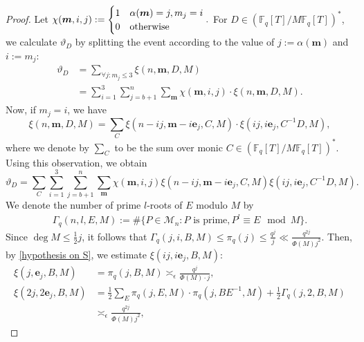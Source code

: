 \documentclass[12pt]{amsart}
\numberwithin{equation}{section}
\theoremstyle{definition}
\theoremstyle{remark}
\newcommand{\FF}{\mathbb{F}}
\begin{document}
\begin{proof}
    Let 
    $        \chi(\boldsymbol{m},i,j) := \begin{cases}
        1 & \alpha(\boldsymbol{m})=j, m_j=i \\
        0 & \textnormal{otherwise}
    \end{cases}.$
    For $D \in (\FF_q[T]/M\FF_q[T])^*$, we calculate $\vartheta_D$ by splitting the event according to the value of $j:= \alpha(\boldsymbol{m})$ and $i:=m_j$:
    \begin{equation}
    \begin{split}
        \vartheta_D &=\sum_{\forall j: m_j \leq 3} \xi(n,\boldsymbol{m},D,M)\\
        &= \sum_{i=1}^3 \sum_{j=b+1}^n \sum_{\boldsymbol{m}} \chi(\boldsymbol{m},i,j) \cdot \xi(n,\boldsymbol{m},D,M).
     \end{split}
    \end{equation}
    Now,  if $m_j=i$, we have
    \[
        \xi(n,\boldsymbol{m},D,M) = \sum_C \xi(n-ij, \boldsymbol{m}-i\boldsymbol{e}_j, C,M) \cdot \xi(ij,i\boldsymbol{e}_j,C^{-1}D,M),
    \]
    where we denote by $\sum_C$ to be the sum over monic $C \in (\FF_q[T]/M\FF_q[T])^*$.
    Using this observation, we obtain
    \begin{equation}\label{eq:theta_calc}
        \vartheta_D = \sum_C \sum_{i=1}^3 \sum_{j=b+1}^n \mathop{\sum}_{\boldsymbol{m}} \chi(\boldsymbol{m},i,j) \xi(n-ij ,\boldsymbol{m} -i \boldsymbol{e}_j,C,M)  \xi(ij,i \boldsymbol{e}_j, C^{-1}D,M).
    \end{equation}
    We denote the number of prime $l$-roots of $E$ modulo $M$ by
    \begin{align*}
        \Gamma_q(n,l,E,M) := \# \{P \in \mathcal{M}_n: P \mbox{ is prime}, P^l \equiv E \mod M \}.
    \end{align*}
    Since $\deg M \leq \frac{1}{2}j$, it follows that  $\Gamma_q(j,i,B,M) \leq \pi_q(j) \leq \frac{q^j}{j} \ll \frac{q^{2j}}{\Phi(M) j^2}$.
    Then, by \eqref{hypothesis on S}, we estimate $\xi(ij,i\boldsymbol{e}_j,B,M)$:
    \begin{equation*}
    \begin{split}
        \xi(j,\boldsymbol{e}_j,B,M) &= \pi_q(j,B,M) \asymp_{\epsilon} \frac{q^j}{\Phi(M) \cdot j}, \\
        \xi(2j,2\boldsymbol{e}_j,B,M) &= \frac{1}{2} \sum_{E} \pi_q(j,E,M) \cdot \pi_q(j,BE^{-1},M) + \frac{1}{2} \Gamma_q(j,2,B,M) \\
        &\asymp_{\epsilon} \frac{q^{2j}}{\Phi(M)j^2},
    \end{split}
    \end{equation*}


\end{proof}
\end{document}
